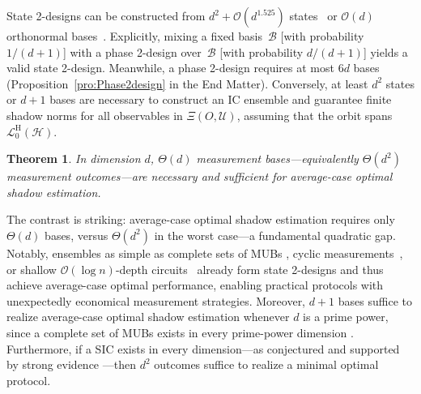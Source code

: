 \documentclass[aps,pra,twocolumn,nofootinbib,superscriptaddress,10pt]{revtex4-2}
\newtheorem{theorem}{Theorem}
\newcommand{\caB}{\mathcal{B}}
\newcommand{\caH}{\mathcal{H}}
\newcommand{\caL}{\mathcal{L}}
\newcommand{\caO}{\mathcal{O}}
\newcommand{\caU}{\mathcal{U}}
\newcommand{\rmH}{\mathrm{H}}
\newcommand{\pref}[1]{Proposition~\ref{#1}}
\begin{document}
State 2-designs can be constructed from $d^2+\caO\left(d^{1.525}\right)$ states~\cite{Jasper25} or $\caO(d)$ orthonormal bases~\cite{Roy07,Gross07}. Explicitly, mixing a fixed basis~$\caB$ [with probability $1/(d+1)$] with a phase 2-design over~$\caB$ [with probability $d/(d+1)$] yields a valid state 2-design. Meanwhile, a phase 2-design requires at most $6d$ bases (\pref{pro:Phase2design} in the End Matter). Conversely, at least $d^2$ states or $d+1$ bases are necessary to construct an IC ensemble and guarantee finite shadow norms for all observables in $\Xi(O,\caU)$, assuming that the orbit spans $\caL^{\rmH}_0(\caH)$. 


\begin{theorem}\label{thm:MMSoptAC}
	In dimension $d$, $\Theta(d)$ measurement bases---equivalently $\Theta(d^2)$ measurement outcomes---are necessary and sufficient for average-case optimal shadow estimation.
\end{theorem}
The contrast is striking: average-case optimal shadow estimation requires only $\Theta(d)$ bases, versus $\Theta(d^2)$ in the worst case---a fundamental quadratic gap. Notably, ensembles as simple as complete sets of MUBs \cite{DURT10,Wootters89,Ivanovic81}, cyclic measurements~\cite{Gonzalez25}, or shallow $\caO(\log n)$-depth circuits~\cite{Cleve16} already form state 2-designs and thus achieve average-case optimal performance, enabling practical protocols with unexpectedly economical measurement strategies. Moreover, $d+1$ bases suffice to realize average-case optimal shadow estimation whenever $d$ is a prime power, since a complete set of MUBs exists in every prime-power dimension \cite{DURT10,Wootters89,Ivanovic81}. Furthermore, if a SIC exists in every dimension---as conjectured and supported by strong evidence \cite{Fuchs17,Zauner11,Renes04,Scott10}---then $d^2$ outcomes suffice to realize a minimal optimal protocol.

\end{document}
